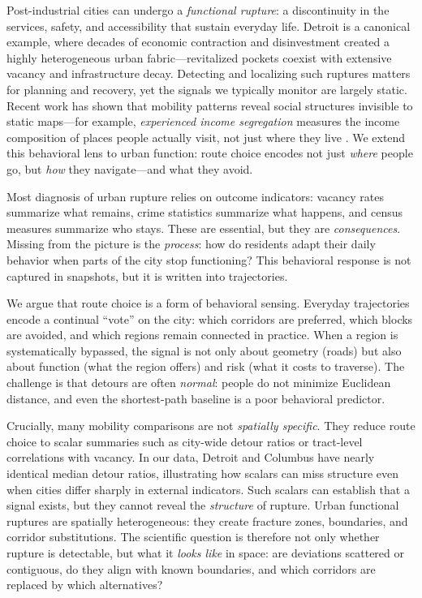 Post-industrial cities can undergo a \emph{functional rupture}: a discontinuity in the services, safety, and accessibility that sustain everyday life. Detroit is a canonical example, where decades of economic contraction and disinvestment created a highly heterogeneous urban fabric---revitalized pockets coexist with extensive vacancy and infrastructure decay. Detecting and localizing such ruptures matters for planning and recovery, yet the signals we typically monitor are largely static. Recent work has shown that mobility patterns reveal social structures invisible to static maps---for example, \emph{experienced income segregation} measures the income composition of places people actually visit, not just where they live \citep{moro2021mobility,nilforoshan2023mobility}. We extend this behavioral lens to urban function: route choice encodes not just \emph{where} people go, but \emph{how} they navigate---and what they avoid.

Most diagnosis of urban rupture relies on outcome indicators: vacancy rates summarize what remains, crime statistics summarize what happens, and census measures summarize who stays. These are essential, but they are \emph{consequences}. Missing from the picture is the \emph{process}: how do residents adapt their daily behavior when parts of the city stop functioning? This behavioral response is not captured in snapshots, but it is written into trajectories.

We argue that route choice is a form of behavioral sensing. Everyday trajectories encode a continual ``vote'' on the city: which corridors are preferred, which blocks are avoided, and which regions remain connected in practice. When a region is systematically bypassed, the signal is not only about geometry (roads) but also about function (what the region offers) and risk (what it costs to traverse). The challenge is that detours are often \emph{normal}: people do not minimize Euclidean distance, and even the shortest-path baseline is a poor behavioral predictor.

Crucially, many mobility comparisons are not \emph{spatially specific}. They reduce route choice to scalar summaries such as city-wide detour ratios or tract-level correlations with vacancy. In our data, Detroit and Columbus have nearly identical median detour ratios, illustrating how scalars can miss structure even when cities differ sharply in external indicators. Such scalars can establish that a signal exists, but they cannot reveal the \emph{structure} of rupture. Urban functional ruptures are spatially heterogeneous: they create fracture zones, boundaries, and corridor substitutions. The scientific question is therefore not only whether rupture is detectable, but what it \emph{looks like} in space: are deviations scattered or contiguous, do they align with known boundaries, and which corridors are replaced by which alternatives?

